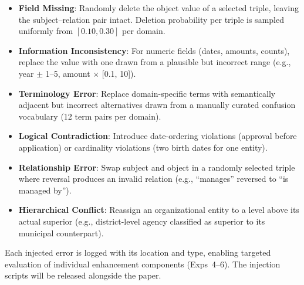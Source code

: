 \begin{appendices}
\begin{itemize}
    \item \textbf{Field Missing}: Randomly delete the object value of a selected triple, leaving the subject--relation pair intact. Deletion probability per triple is sampled uniformly from $[0.10, 0.30]$ per domain.
    \item \textbf{Information Inconsistency}: For numeric fields (dates, amounts, counts), replace the value with one drawn from a plausible but incorrect range (e.g., year $\pm$ 1--5, amount $\times$ [0.1, 10]).
    \item \textbf{Terminology Error}: Replace domain-specific terms with semantically adjacent but incorrect alternatives drawn from a manually curated confusion vocabulary (12 term pairs per domain).
    \item \textbf{Logical Contradiction}: Introduce date-ordering violations (approval before application) or cardinality violations (two birth dates for one entity).
    \item \textbf{Relationship Error}: Swap subject and object in a randomly selected triple where reversal produces an invalid relation (e.g., ``manages'' reversed to ``is managed by'').
    \item \textbf{Hierarchical Conflict}: Reassign an organizational entity to a level above its actual superior (e.g., district-level agency classified as superior to its municipal counterpart).
\end{itemize}

Each injected error is logged with its location and type, enabling targeted evaluation of individual enhancement components (Exps~4--6). The injection scripts will be released alongside the paper.

\end{appendices}
